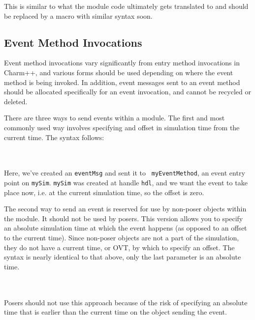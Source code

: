 This is similar to what the module code ultimately gets translated to
and should be replaced by a macro with similar syntax soon.

\subsection{Event Method Invocations}

Event method invocations vary significantly from entry method
invocations in Charm++, and various forms should be used depending on
where the event method is being invoked.  In addition, event messages
sent to an event method should be allocated specifically for an event
invocation, and cannot be recycled or deleted.

There are three ways to send events within a \pose{} module.  The first
and most commonly used way involves specifying and offset in
simulation time from the current time.  The syntax follows:

~\\
\\

Here, we've created an {\tt eventMsg} and sent it to {\tt
myEventMethod}, an event entry point on {\tt mySim}.  {\tt mySim} was
created at handle {\tt hdl}, and we want the event to take place now,
i.e. at the current simulation time, so the offset is zero.  

The second way to send an event is reserved for use by non-poser
objects within the module.  It should not be used by posers.  This
version allows you to specify an absolute simulation time at which the
event happens (as opposed to an offset to the current time).  Since
non-poser objects are not a part of the simulation, they do not have a
current time, or OVT, by which to specify an offset.  The syntax is
nearly identical to that above, only the last parameter is an absolute
time.

~\\
\\

Posers should not use this approach because of the risk of specifying
an absolute time that is earlier than the current time on the object
sending the event.  

